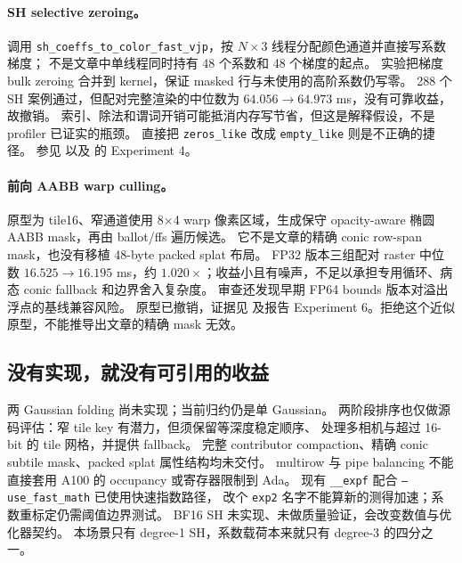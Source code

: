 \paragraph{SH selective zeroing。}
调用 \texttt{sh\_coeffs\_to\_color\_fast\_vjp}，按 \(N\times3\) 线程分配颜色通道并直接写系数梯度；
不是文章中单线程同时持有 48 个系数和 48 个梯度的起点。
实验把梯度 bulk zeroing 合并到 kernel，保证 masked 行与未使用的高阶系数仍写零。
288 个 SH 案例通过，但配对完整渲染的中位数为
\(64.056\rightarrow64.973\) ms，没有可靠收益，故撤销。
索引、除法和谓词开销可能抵消内存写节省，但这是解释假设，不是 profiler 已证实的瓶颈。
直接把 \texttt{zeros\_like} 改成 \texttt{empty\_like} 则是不正确的捷径。
参见 
以及  的 Experiment 4。

\paragraph{前向 AABB warp culling。}
原型为 tile16、窄通道使用 8\(\times\)4 warp 像素区域，生成保守 opacity-aware
椭圆 AABB mask，再由 ballot/ffs 遍历候选。
它不是文章的精确 conic row-span mask，也没有移植 48-byte packed splat 布局。
FP32 版本三组配对 raster 中位数 \(16.525\rightarrow16.195\) ms，约
\(1.020\times\)；收益小且有噪声，不足以承担专用循环、病态 conic fallback 和边界舍入复杂度。
审查还发现早期 FP64 bounds 版本对溢出浮点的基线兼容风险。
原型已撤销，证据见 
及报告 Experiment 6。拒绝这个近似原型，不能推导出文章的精确 mask 无效。

\subsection{没有实现，就没有可引用的收益}

两 Gaussian folding 尚未实现；当前归约仍是单 Gaussian。
两阶段排序也仅做源码评估：窄 tile key 有潜力，但须保留等深度稳定顺序、
处理多相机与超过 16-bit 的 tile 网格，并提供 fallback。
完整 contributor compaction、精确 conic subtile mask、packed splat 属性结构均未交付。
multirow 与 pipe balancing 不能直接套用 A100 的 occupancy 或寄存器限制到 Ada。
现有 \texttt{\_\_expf} 配合 \texttt{--use\_fast\_math} 已使用快速指数路径，
改个 \texttt{exp2} 名字不能算新的测得加速；系数重标定仍需阈值边界测试。
BF16 SH 未实现、未做质量验证，会改变数值与优化器契约。
本场景只有 degree-1 SH，系数载荷本来就只有 degree-3 的四分之一。

